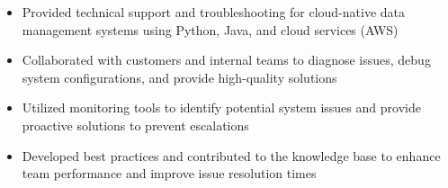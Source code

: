 \par\bigskip
{}
\par\smallskip
\begin{minipage}{13.75cm}
  \begin{minipage}{6.5cm}
    \begin{itemize}
      \item Provided technical support and troubleshooting for cloud-native data management systems using Python, Java, and cloud services (AWS)
      \item Collaborated with customers and internal teams to diagnose issues, debug system configurations, and provide high-quality solutions
    \end{itemize}
  \end{minipage}
  \hfill
  \begin{minipage}{6.5cm}
    \begin{itemize}
      \item Utilized monitoring tools to identify potential system issues and provide proactive solutions to prevent escalations
      \item Developed best practices and contributed to the knowledge base to enhance team performance and improve issue resolution times
    \end{itemize}
  \end{minipage}
\end{minipage}
\par\smallskip
\divider

